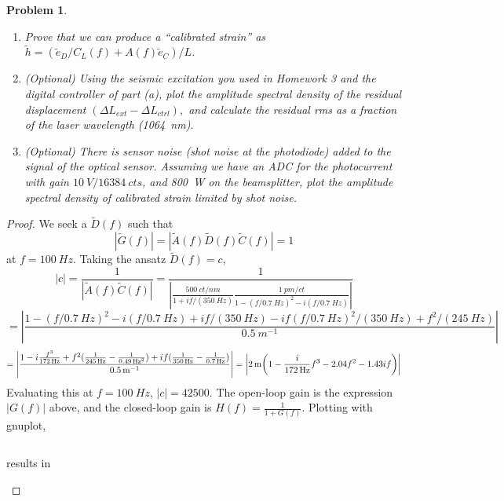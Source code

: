 \documentclass{article}
\newtheorem{plm}{Problem}
\begin{document}
\begin{plm}
\begin{enumerate}
    and plot the open-loop gain and the closed-loop gain for frequencies between \SI{0.1}{Hz} and \SI{1}{kHz}.
  \item Prove that we can produce a ``calibrated strain'' as $\tilde{h} = (\tilde{e}_{D}/C_{L}(f) + A(f)\tilde{e}_{C})/L$.
  \item (Optional) Using the seismic excitation you used in Homework 3 and the digital controller of part (a),
    plot the amplitude spectral density of the residual displacement $(\Delta L_{ext} - \Delta L_{ctrl}),$
    and calculate the residual rms as a fraction of the laser wavelength (\SI{1064}{nm}).
  \item (Optional) There is sensor noise (shot noise at the photodiode) added to the signal of the optical sensor.
    Assuming we have an ADC for the photocurrent with gain $\SI{10}{V}/\SI{16384}{cts}$, and \SI{800}{W} on the beamsplitter,
    plot the amplitude spectral density of calibrated strain limited by shot noise.
  \end{enumerate}
\end{plm}

\begin{proof}
  We seek a $\tilde{D}(f)$ such that
  \[
    |\tilde{G}(f)| = |\tilde{A}(f)\tilde{D}(f)\tilde{C}(f)| = 1
  \]
  at $f = \SI{100}{Hz}$.
  Taking the ansatz $\tilde{D}(f) = c$,
  \[
    |c| = \frac{1}{|\tilde{A}(f)\tilde{C}(f)|} = \frac{1}{\left|\frac{\SI{500}{ct/nm}}{1 + if/(\SI{350}{Hz})}
        \frac{\SI{1}{pm/ct}}{1 - (f/\SI{0.7}{Hz})^{2} - i(f / \SI{0.7}{Hz})}\right|}
  \]
  \[
    = \left|\frac{1 - (f / \SI{0.7}{Hz})^{2} - i(f / \SI{0.7}{Hz}) + if/(\SI{350}{Hz}) - if(f / \SI{0.7}{Hz})^{2}/(\SI{350}{Hz})
        + f^{2}/(\SI{245}{Hz})}{\SI{0.5}{m^{-1}}}\right|
  \]
  \[
    = \left| \frac{1 - i\frac{f^{3}}{\SI{172}{Hz}}+ f^{2}(\frac{1}{\SI{245}{Hz}} - \frac{1}{\SI{0.49}{Hz^{2}}})
      + if(\frac{1}{\SI{350}{Hz}} - \frac{1}{\SI{0.7}{Hz}})}{\SI{0.5}{m^{-1}}} \right|
    = \left| \SI{2}{m}\qty(1 - \frac{i}{\SI{172}{Hz}}f^{3} - {2.04}f^{2} - 1.43if) \right|
  \]
  Evaluating this at $f = \SI{100}{Hz}$, $|c| = 42500$.
  The open-loop gain is the expression $|G(f)|$ above, and the closed-loop gain is $H(f) = \frac{1}{1 + G(f)}$.
  Plotting with gnuplot,
  \begin{center}
    \inputminted{gnuplot}{p2.gp}
  \end{center}
  results in
  \begin{center}
    
  \end{center}
\end{proof}
\end{document}
